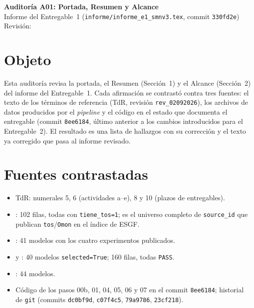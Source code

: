 \newcommand{\auditoriaid}{A01 -- Portada, Resumen y Alcance}



\begin{center}
{\Large\bfseries Auditoría A01: Portada, Resumen y Alcance}\\[0.4em]
{\normalsize Informe del Entregable~1 (\texttt{informe/informe\_e1\_smnv3.tex}, commit \texttt{330fd2e})}\\[0.2em]
{\small Revisión: \fechaentrega}
\end{center}

\section{Objeto}

Esta auditoría revisa la portada, el Resumen (Sección~1) y el Alcance (Sección~2) del informe del Entregable~1. Cada afirmación se contrastó contra tres fuentes: el texto de los términos de referencia (TdR, revisión \texttt{rev\_02092026}), los archivos de datos producidos por el \emph{pipeline} y el código en el estado que documenta el entregable (commit \texttt{8ee6184}, último anterior a los cambios introducidos para el Entregable~2). El resultado es una lista de hallazgos con su corrección y el texto ya corregido que pasa al informe revisado.


\section{Fuentes contrastadas}

\begin{itemize}[leftmargin=1.2em]
\item TdR: numerales 5, 6 (actividades a--e), 8 y 10 (plazos de entregables).
\item {}: 102 filas, todas con \texttt{tiene\_tos=1}; es el universo completo de \texttt{source\_id} que publican \texttt{tos}/\texttt{Omon} en el índice de ESGF.
\item {}: 41 modelos con los cuatro experimentos publicados.
\item {} y : 40 modelos \texttt{selected=True}; 160 filas, todas \texttt{PASS}.
\item {}: 44 modelos.
\item Código de los pasos 00b, 01, 04, 05, 06 y 07 en el commit \texttt{8ee6184}; historial de \texttt{git} (commits \texttt{dc0bf9d}, \texttt{c07f4c5}, \texttt{79a9786}, \texttt{23cf218}).
\end{itemize}

